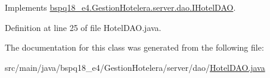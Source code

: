 Implements \mbox{\hyperlink{interfacebspq18__e4_1_1_gestion_hotelera_1_1server_1_1dao_1_1_i_hotel_d_a_o_a4e3c6763bb643d660babac78c6e29559}{bspq18\+\_\+e4.\+Gestion\+Hotelera.\+server.\+dao.\+I\+Hotel\+D\+AO}}.



Definition at line 25 of file Hotel\+D\+A\+O.\+java.



The documentation for this class was generated from the following file\+:\begin{DoxyCompactItemize}
\item 
src/main/java/bspq18\+\_\+e4/\+Gestion\+Hotelera/server/dao/\mbox{\hyperlink{_hotel_d_a_o_8java}{Hotel\+D\+A\+O.\+java}}\end{DoxyCompactItemize}
